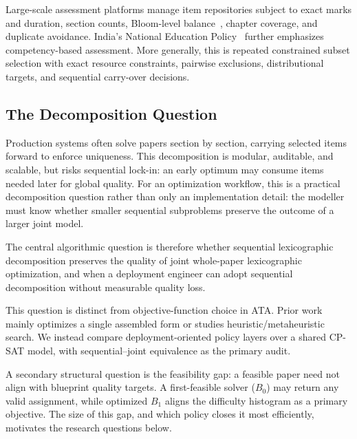 \documentclass[runningheads]{llncs}
\begin{document}
Large-scale assessment platforms manage item repositories subject to exact marks and duration, section counts, Bloom-level balance~\cite{bloom1956,anderson2001}, chapter coverage, and duplicate avoidance. India's National Education Policy~\cite{moenep2020} further emphasizes competency-based assessment. More generally, this is repeated constrained subset selection with exact resource constraints, pairwise exclusions, distributional targets, and sequential carry-over decisions.

\subsection{The Decomposition Question}
Production systems often solve papers section by section, carrying selected items forward to enforce uniqueness. This decomposition is modular, auditable, and scalable, but risks sequential lock-in: an early optimum may consume items needed later for global quality. For an optimization workflow, this is a practical decomposition question rather than only an implementation detail: the modeller must know whether smaller sequential subproblems preserve the outcome of a larger joint model.

The central algorithmic question is therefore whether sequential lexicographic decomposition preserves the quality of joint whole-paper lexicographic optimization, and when a deployment engineer can adopt sequential decomposition without measurable quality loss.

This question is distinct from objective-function choice in ATA. Prior work~\cite{vanderLinden2005,theunissen1985,ignjatovic2021,li2021,nguyen2021} mainly optimizes a single assembled form or studies heuristic/metaheuristic search. We instead compare deployment-oriented policy layers over a shared CP-SAT model, with sequential--joint equivalence as the primary audit.

A secondary structural question is the feasibility gap: a feasible paper need not align with blueprint quality targets. A first-feasible solver ($B_0$) may return any valid assignment, while optimized $B_1$ aligns the difficulty histogram as a primary objective. The size of this gap, and which policy closes it most efficiently, motivates the research questions below.
\end{document}
